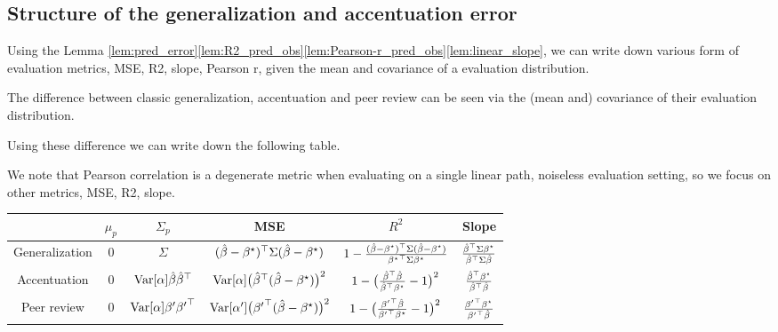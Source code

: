 \documentclass{article}
\theoremstyle{plain}
\theoremstyle{definition}
\begin{document}
\subsection{Structure of the generalization and accentuation error}

Using the Lemma \ref{lem:pred_error}\ref{lem:R2_pred_obs}\ref{lem:Pearson-r_pred_obs}\ref{lem:linear_slope},
we can write down various form of evaluation metrics, MSE, R2, slope,
Pearson r, given the mean and covariance of a evaluation distribution.

The difference between classic generalization, accentuation and peer
review can be seen via the (mean and) covariance of their evaluation
distribution.

Using these difference we can write down the following table.

We note that Pearson correlation is a degenerate metric when evaluating
on a single linear path, noiseless evaluation setting, so we focus
on other metrics, MSE, R2, slope.
\begin{center}
\small
\begin{tabular}{c|c|c|c|c|c}
\hline
 & $\mu_{p}$ & $\Sigma_{p}$ & MSE & $R^2$ & Slope \tabularnewline %
\hline
\hline
Generalization & $0$ & $\Sigma$ & $(\hat{\beta}-{\beta^{\star}})^{\top}\Sigma(\hat{\beta}-{\beta^{\star}})$ & $1-\frac{(\hat{\beta}-{\beta^{\star}})^{\top}\Sigma(\hat{\beta}-{\beta^{\star}})}{{{\beta^{\star}}}^{\top}\Sigma{\beta^{\star}}}$ & $\frac{{\hat{\beta}}^{\top}\Sigma{\beta^{\star}}}{{\hat{\beta}}^{\top}\Sigma\hat{\beta}}$ \tabularnewline %
\hline
Accentuation & $0$ & $\mathrm{Var}[\alpha]\hat{\beta}{\hat{\beta}}^{\top}$ & $\mathrm{Var}[\alpha]\big({\hat{\beta}}^{\top}(\hat{\beta}-{\beta^{\star}})\big)^{2}$ & $1-\big(\frac{{\hat{\beta}}^{\top}\hat{\beta}}{{\hat{\beta}}^{\top}{\beta^{\star}}}-1\big)^{2}$ & $\frac{{\hat{\beta}}^{\top}{\beta^{\star}}}{{\hat{\beta}}^{\top}\hat{\beta}}$ \tabularnewline %
\hline
Peer review & $0$ & $\mathrm{Var}[\alpha]{\beta^{\prime}}{{\beta^{\prime}}}^{\top}$ & $\mathrm{Var}[\alpha^{\prime}]\big({{\beta^{\prime}}}^{\top}(\hat{\beta}-{\beta^{\star}})\big)^{2}$ & $1-\big(\frac{{{\beta^{\prime}}}^{\top}\hat{\beta}}{{{\beta^{\prime}}}^{\top}{\beta^{\star}}}-1\big)^{2}$ & $\frac{{{\beta^{\prime}}}^{\top}{\beta^{\star}}}{{{\beta^{\prime}}}^{\top}\hat{\beta}}$ \tabularnewline %
\hline
\end{tabular}
\par\end{center}
\end{document}
